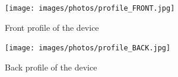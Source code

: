             \begin{figure}[H]
                \centering
                \begin{minipage}[b]{0.45\textwidth}
                    \centering
                    \texttt{[image: images/photos/profile\_FRONT.jpg]}
                    \caption{Front profile of the device}
                    \label{fig:front}
                \end{minipage}
                \hfill
                \begin{minipage}[b]{0.45\textwidth}
                    \centering
                    \texttt{[image: images/photos/profile\_BACK.jpg]}
                    \caption{Back profile of the device}
                    \label{fig:back}
                \end{minipage}
            \end{figure}
    
